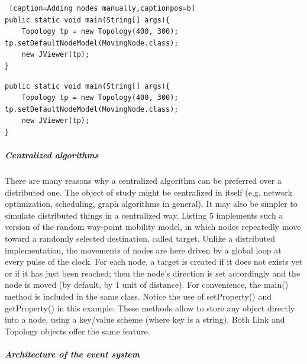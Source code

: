 \begin{lstlisting} [caption=Adding nodes manually,captionpos=b]
public static void main(String[] args){
	Topology tp = new Topology(400, 300); tp.setDefaultNodeModel(MovingNode.class);
	new JViewer(tp);
}
\end{lstlisting}

\begin{lstlisting}[caption=Using a defined node as default, captionpos=b]
public static void main(String[] args){
	Topology tp = new Topology(400, 300); tp.setDefaultNodeModel(MovingNode.class);
	new JViewer(tp);
}
\end{lstlisting}


\subparagraph{Centralized algorithms}There are many reasons why a centralized algorithm can be preferred over a distributed one. The object of study might be centralized in itself (e.g. network optimization, scheduling, graph algorithms in general). It may also be simpler to simulate distributed things in a centralized way. Listing 5 implements such a version of the random way-point mobility model, in which nodes repeatedly move toward a randomly selected destination, called target. Unlike a distributed implementation, the movements of nodes are here driven by a global loop at every pulse of the clock. For each node, a target is created if it does not exists yet or if it has just been reached; then the node’s direction is set accordingly and the node is moved (by default, by 1 unit of distance). For convenience, the main() method is included in the same class. Notice the use of setProperty() and getProperty() in this example. These methods allow to store any object directly into a node, using a key/value scheme (where key is a string). Both Link and Topology objects offer the same feature.
\subparagraph{Architecture of the event system}
